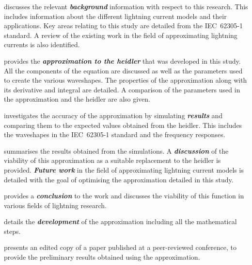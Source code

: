  discusses the relevant \textbf{\textit{background}} information with respect to this research. This includes information about the different lightning current models and their applications. Key areas relating to this study are detailed from the IEC~62305-1 standard. A review of the existing work in the field of approximating lightning currents is also identified.

 provides the \textbf{\textit{approximation to the \gls{heidler}}} that was developed in this study. All the components of the equation are discussed as well as the parameters used to create the various waveshapes. The properties of the approximation along with its derivative and integral are detailed. A comparison of the parameters used in the approximation and the \gls{heidler} are also given.

 investigates the accuracy of the approximation by simulating \textbf{\textit{results}} and comparing them to the expected values obtained from the \gls{heidler}. This includes the waveshapes in the IEC~62305-1 standard and the frequency responses.

 summarises the results obtained from the simulations. A \textbf{\textit{discussion}} of the viability of this approximation as a suitable replacement to the \gls{heidler} is provided. \textbf{\textit{Future work}} in the field of approximating lightning current models is detailed with the goal of optimising the approximation detailed in this study.

 provides a \textbf{\textit{conclusion}} to the work and discusses the viability of this function in various fields of lightning research.

 details the \textbf{\textit{development}} of the approximation including all the mathematical steps.

 presents an edited copy of a paper published at a peer-reviewed conference, to provide the preliminary results obtained using the approximation.

